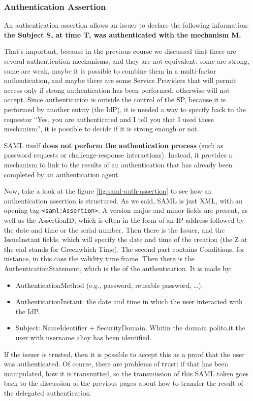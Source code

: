 \subsubsection{Authentication Assertion}

An authentication assertion allows an issuer to declare the following
information: \textbf{the Subject S, at time T, was authenticated with
the mechanism M.}

That’s important, because in the previous course we discussed that
there are several authentication mechanisms, and they are not
equivalent: some are strong, some are weak, maybe it is possible to
combine them in a multi-factor authentication, and maybe there are
some Service Providers that will permit access only if strong
authentication has been performed, otherwise will not accept. Since
authentication is outside the control of the SP, because it is
performed by another entity (the IdP), it is needed a way to specify
back to the requestor “Yes, you are authenticated and I tell you that
I used these mechanism”, it is possible to decide if it is strong
enough or not.

\begin{boxH}
  SAML itself \textbf{does not perform the authentication process}
  (such as password requests or challenge-response interactions).
  Instead, it provides a mechanism to link to the results of an
  authentication that has already been completed by an authentication
  agent.
\end{boxH}

Now, take a look at the figure \ref{fig:saml-auth-assertion} to see
how an authentication assertion is structured. As we said, SAML is
just XML, with an opening tag \texttt{<saml:Assertion>}. A
version major and minor fields are present, as well as the
AssertionID, which is often in the form of an IP address followed by
the date and time or the serial number. Then there is the Issuer, and
the IssueInstant fields, which will specify the date and time of the
creation (the Z at the end stands for Greenwhich Time). The second
part contains Conditions, for instance, in this case the validity time
frame. Then there is the AuthenticationStatement, which is the of the
authentication. It is made by:
\begin{itemize}
  \item AuthenticationMethod (e.g., password, reusable password, …).
  \item AuthenticationInstant: the date and time in which the user
    interacted with the IdP.
  \item Subject: NameIdentifier + SecurityDomain. Whitin the domain
    polito.it the user with username alioy has been identified.
\end{itemize}
If the issuer is trusted, then it is possible to accept this as a
proof that the user was authenticated. Of course, there are problems
of trust: if that has been manipulated, how it is transmitted, so the
transmission of this SAML token goes back to the discussion of the
previous pages about how to transfer the result of the delegated
authentication.

